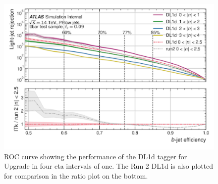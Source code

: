 \newpage

\begin{figure}[H]
    \centering
    \includegraphics[scale=0.75]{figs/ch5/rejveff_eta.png}
    \caption{ ROC curve showing the performance of the DL1d tagger for Upgrade in four eta intervals of one. The Run 2 DL1d is also plotted for comparison in the ratio plot on the bottom.}
\label{fig:dl1d-eta-comp}
\end{figure}
